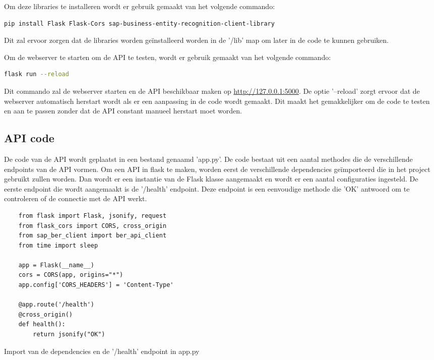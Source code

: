 Om deze libraries te installeren wordt er gebruik gemaakt van het volgende commando:
\begin{lstlisting}[language=bash]
    pip install Flask Flask-Cors sap-business-entity-recognition-client-library
\end{lstlisting}
Dit zal ervoor zorgen dat de libraries worden geïnstalleerd worden in de '/lib' map om later in de code te kunnen gebruiken.

Om de webserver te starten om de API te testen, wordt er gebruik gemaakt van het volgende commando:
\begin{lstlisting}[language=bash]
    flask run --reload
\end{lstlisting}

Dit commando zal de webserver starten en de API beschikbaar maken op \url{http://127.0.0.1:5000}. De optie '--reload' zorgt ervoor dat de webserver automatisch herstart wordt als er een aanpassing in de code wordt gemaakt. Dit maakt het gemakkelijker om de code te testen en aan te passen zonder dat de API constant manueel herstart moet worden.

\subsection{API code}

De code van de API wordt geplaatst in een bestand genaamd 'app.py'. De code bestaat uit een aantal methodes die de verschillende endpoints van de API vormen.
Om een API in flask te maken, worden eerst de verschillende dependencies geïmporteerd die in het project gebruikt zullen worden. Dan wordt er een instantie van de Flask klasse aangemaakt en wordt er een aantal configuraties ingesteld. De eerste endpoint die wordt aangemaakt is de '/health' endpoint. Deze endpoint is een eenvoudige methode die 'OK' antwoord om te controleren of de connectie met de API werkt.

\begin{listing}[H]
\begin{verbatim}
    from flask import Flask, jsonify, request
    from flask_cors import CORS, cross_origin
    from sap_ber_client import ber_api_client
    from time import sleep

    app = Flask(__name__)
    cors = CORS(app, origins="*")
    app.config['CORS_HEADERS'] = 'Content-Type'

    @app.route('/health')
    @cross_origin()
    def health():
        return jsonify("OK")
\end{verbatim}
\caption{Import van de dependencies en de '/health' endpoint in app.py}
\end{listing}

